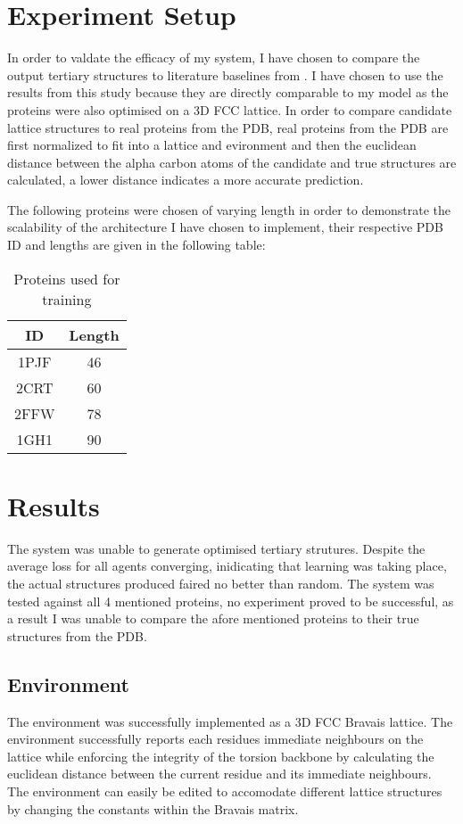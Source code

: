 \section{Experiment Setup}
In order to valdate the efficacy of my system, I have chosen to compare the output
tertiary structures to literature baselines from \cite{Hoque}. I have chosen
to use the results from this study because they are directly comparable
to my model as the proteins were also optimised on a 3D FCC lattice.
In order to compare candidate lattice structures to real proteins
from the PDB, real proteins from the PDB are first normalized to fit
into a lattice and evironment and then the euclidean distance between the alpha carbon atoms
of the candidate and true structures are calculated, a lower distance indicates
a more accurate prediction.

The following proteins were chosen of varying length in order
to demonstrate the scalability of the architecture I have chosen to implement,
their respective PDB ID and lengths are given in the following table:
\begin{table}[!htb]
    \begin{center}
        \caption{Proteins used for training}
\begin{tabular}{||c | c||}
    \hline
    ID & Length\\
    \hline\hline
    1PJF  & 46  \\ 
    \hline
    2CRT & 60  \\
    \hline
    2FFW & 78 \\
    \hline
    1GH1 & 90  \\
    \hline
\end{tabular}
\end{center}
\end{table}
\section{Results}
The system was unable to generate optimised tertiary strutures.
Despite the average loss for all agents converging, inidicating that
learning was taking place, the actual structures produced faired no
better than random. The system was tested against all 4 mentioned proteins,
no experiment proved to be successful, as a result I was unable to compare
the afore mentioned proteins to their true structures from the PDB.

\subsection{Environment}
The environment was successfully implemented as a 3D FCC Bravais lattice.
The environment successfully reports each residues immediate neighbours
on the lattice while enforcing the integrity of the torsion backbone
by calculating the euclidean distance between the current residue and
its immediate neighbours. The environment can easily be edited
to accomodate different lattice structures by changing the constants
within the Bravais matrix.

